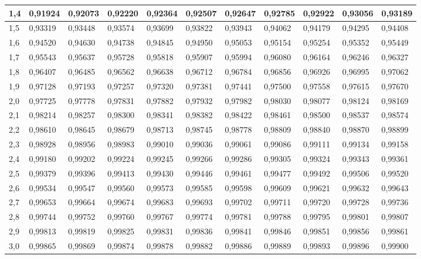\documentclass[12pt,a4paper,twocolumn]{article}
\begin{document}
\begin{tabular}{l|l|l|l|l|l|l|l|l|l|l}
1,4 & 0,91924 & 0,92073 & 0,92220 & 0,92364 & 0,92507 & 0,92647 & 0,92785 & 0,92922 & 0,93056 & 0,93189\\ \hline
1,5 & 0,93319 & 0,93448 & 0,93574 & 0,93699 & 0,93822 & 0,93943 & 0,94062 & 0,94179 & 0,94295 & 0,94408\\ \hline
1,6 & 0,94520 & 0,94630 & 0,94738 & 0,94845 & 0,94950 & 0,95053 & 0,95154 & 0,95254 & 0,95352 & 0,95449\\ \hline
1,7 & 0,95543 & 0,95637 & 0,95728 & 0,95818 & 0,95907 & 0,95994 & 0,96080 & 0,96164 & 0,96246 & 0,96327\\ \hline
1,8 & 0,96407 & 0,96485 & 0,96562 & 0,96638 & 0,96712 & 0,96784 & 0,96856 & 0,96926 & 0,96995 & 0,97062\\ \hline
1,9 & 0,97128 & 0,97193 & 0,97257 & 0,97320 & 0,97381 & 0,97441 & 0,97500 & 0,97558 & 0,97615 & 0,97670\\ \hline
2,0 & 0,97725 & 0,97778 & 0,97831 & 0,97882 & 0,97932 & 0,97982 & 0,98030 & 0,98077 & 0,98124 & 0,98169\\ \hline
2,1 & 0,98214 & 0,98257 & 0,98300 & 0,98341 & 0,98382 & 0,98422 & 0,98461 & 0,98500 & 0,98537 & 0,98574\\ \hline
2,2 & 0,98610 & 0,98645 & 0,98679 & 0,98713 & 0,98745 & 0,98778 & 0,98809 & 0,98840 & 0,98870 & 0,98899\\ \hline
2,3 & 0,98928 & 0,98956 & 0,98983 & 0,99010 & 0,99036 & 0,99061 & 0,99086 & 0,99111 & 0,99134 & 0,99158\\ \hline
2,4 & 0,99180 & 0,99202 & 0,99224 & 0,99245 & 0,99266 & 0,99286 & 0,99305 & 0,99324 & 0,99343 & 0,99361\\ \hline
2,5 & 0,99379 & 0,99396 & 0,99413 & 0,99430 & 0,99446 & 0,99461 & 0,99477 & 0,99492 & 0,99506 & 0,99520\\ \hline
2,6 & 0,99534 & 0,99547 & 0,99560 & 0,99573 & 0,99585 & 0,99598 & 0,99609 & 0,99621 & 0,99632 & 0,99643\\ \hline
2,7 & 0,99653 & 0,99664 & 0,99674 & 0,99683 & 0,99693 & 0,99702 & 0,99711 & 0,99720 & 0,99728 & 0,99736\\ \hline
2,8 & 0,99744 & 0,99752 & 0,99760 & 0,99767 & 0,99774 & 0,99781 & 0,99788 & 0,99795 & 0,99801 & 0,99807\\ \hline
2,9 & 0,99813 & 0,99819 & 0,99825 & 0,99831 & 0,99836 & 0,99841 & 0,99846 & 0,99851 & 0,99856 & 0,99861\\ \hline
3,0 & 0,99865 & 0,99869 & 0,99874 & 0,99878 & 0,99882 & 0,99886 & 0,99889 & 0,99893 & 0,99896 & 0,99900\\ \hline

\end{tabular}
\end{document}
